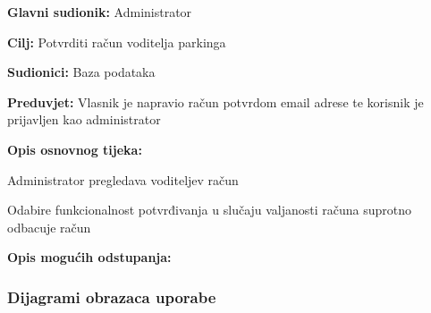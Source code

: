\begin{packed_item}
\begin{packed_item}
\begin{packed_item}
\begin{packed_enum}
    					\end{packed_enum}
    						
    					\end{packed_item}
    				\end{packed_item}
    				\noindent {}
    				\begin{packed_item}
    					
    					\item \textbf{Glavni sudionik: } Administrator
    					\item  \textbf{Cilj:} Potvrditi račun voditelja parkinga
    					\item  \textbf{Sudionici:} Baza podataka
    					\item  \textbf{Preduvjet:} Vlasnik je napravio račun potvrdom email adrese te korisnik je prijavljen kao administrator
    					\item  \textbf{Opis osnovnog tijeka:}
    					
    					\item[] \begin{packed_enum}
    						
    						\item Administrator pregledava voditeljev račun
    						\item Odabire funkcionalnost potvrđivanja u slučaju valjanosti računa suprotno odbacuje račun

    					\end{packed_enum}
    					
    					\item  \textbf{Opis mogućih odstupanja:}
    					
    					
    				\end{packed_item}
    				
				
					
				\subsubsection{Dijagrami obrazaca uporabe}
					

\end{packed_item}
